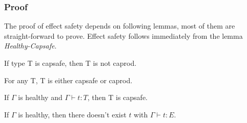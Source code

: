 
\subsubsection{Proof}

The proof of effect safety depends on following lemmas, most of them
are straight-forward to prove. Effect safety follows immediately from
the lemma \emph{Healthy-Capsafe}.


\begin{lemma}
 If type T is capsafe, then T is not caprod.
\end{lemma}

\begin{lemma}
 For any T, T is either capsafe or caprod.
\end{lemma}



\begin{lemma}
  If $\Gamma$ is healthy and $\Gamma \vdash t : T$, then T is capsafe.
\end{lemma}

\begin{theorem}
  If $\Gamma$ is healthy, then there doesn't exist $t$ with
  $\Gamma \vdash t : E$.
\end{theorem}


